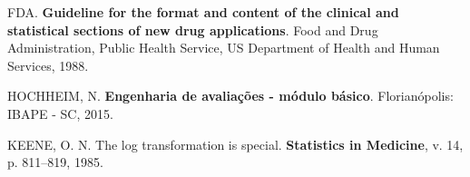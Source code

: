 \documentclass[a4paper]{article}
\begin{document}
\hypertarget{ref-fda}{}
FDA. \textbf{Guideline for the format and content of the clinical and
statistical sections of new drug applications}. Food and Drug
Administration, Public Health Service, US Department of Health and Human
Services, 1988.

\hypertarget{ref-hochheim}{}
HOCHHEIM, N. \textbf{Engenharia de avaliações - módulo básico}.
Florianópolis: IBAPE - SC, 2015.

\hypertarget{ref-keene}{}
KEENE, O. N. The log transformation is special. \textbf{Statistics in
Medicine}, v. 14, p. 811--819, 1985.
\end{document}
